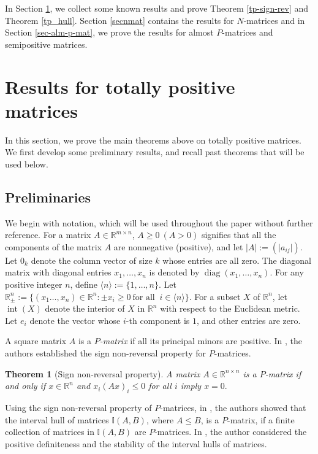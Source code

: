 \documentclass[11pt]{article}
\newtheorem{theorem}{Theorem}[section]
\DeclareMathOperator{\inte }{int}
\DeclareMathOperator{\diag }{diag}
\begin{document}
In Section \ref{secTP}, we collect some known results and prove Theorem \ref{tp-sign-rev} and Theorem \ref{tp_hull}. Section \ref{secnmat} contains the results for $N$-matrices and in Section \ref{sec-alm-p-mat}, we prove the results for almost $P$-matrices and semipositive matrices.
\section{Results for totally positive matrices}\label{secTP}

In this section, we prove the main theorems above on totally positive
matrices. We first develop some preliminary results, and recall past
theorems that will be used below.

\subsection{Preliminaries}

We begin with notation, which will be used throughout the paper without
further reference.
 For a matrix $A \in \mathbb{R}^{m \times n}$, $A \geq 0 ~(A>0)$ signifies that all the components of the matrix $A$ are nonnegative (positive), and let $\vert A\vert := (\vert a_{ij}\vert)$. %
  Let $0_k$ denote the column vector of size $k$ whose entries are all
  zero. The diagonal matrix with diagonal entries $x_1, \dots, x_n$ is
  denoted by $\diag(x_1, \dots, x_n)$. For any positive integer $n$,
  define $\langle n \rangle := \{1,\dots, n\}$. Let $\mathbb{R}_\pm^n :=
  \{(x_1\dots,x_n) \in \mathbb{R}^{n}: \pm x_i \geq 0 ~\mbox{for all }~ i
  \in \langle n \rangle \}$.  For a subset $X$ of $\mathbb{R}^n$, let
  $\inte(X)$ denote the interior of $X$ in $\mathbb{R}^n$ with respect to
  the Euclidean metric. Let $e_i$ denote the vector whose $i$-th
  component is $1$, and other entries are zero.

A square matrix $A$ is a \textit{$P$-matrix} if all its principal minors are positive. In \cite{gale-nikai-pmat}, the authors established the sign non-reversal  property for $P$-matrices. \begin{theorem}[Sign non-reversal property]\label{snrp}
	A matrix $A \in \mathbb{R}^{n \times n}$ is a $P$-matrix if and only if $x \in \mathbb{R}^n$ and $x_i(Ax)_i \leq 0$ for all $i$ imply $x=0.$
\end{theorem}
Using the sign non-reversal property of $P$-matrices, in \cite{RJRG}, the
authors showed that the interval hull  of matrices $\mathbb{I}(A, B)$, where $A \leq B$, is a $P$-matrix, if a finite collection of matrices in  $\mathbb{I}(A, B)$ are $P$-matrices. In \cite{rohn1}, the author considered the positive definiteness and  the stability of the interval hulls of matrices.
\end{document}
